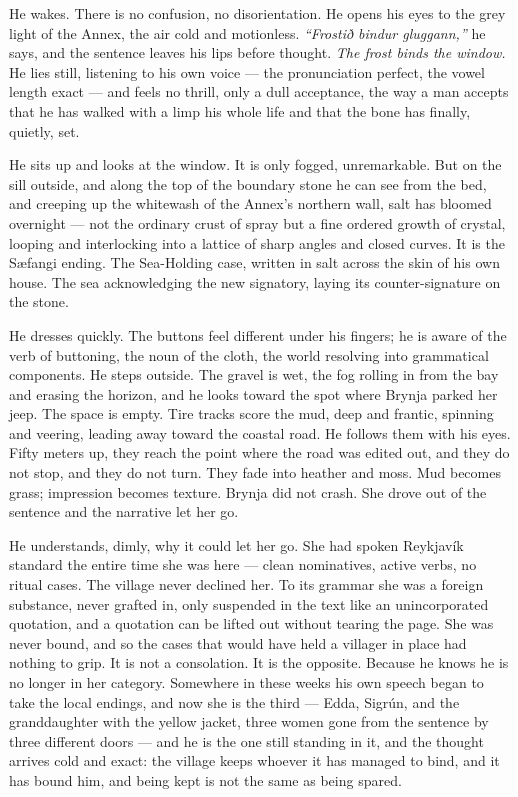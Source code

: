 \documentclass[11pt,oneside]{book}
\begin{document}
He wakes. There is no confusion, no disorientation. He opens his eyes to
the grey light of the Annex, the air cold and motionless.
\emph{``Frostið bindur gluggann,''} he says, and the sentence leaves his
lips before thought. \emph{The frost binds the window.} He lies still,
listening to his own voice --- the pronunciation perfect, the vowel
length exact --- and feels no thrill, only a dull acceptance, the way a
man accepts that he has walked with a limp his whole life and that the
bone has finally, quietly, set.

He sits up and looks at the window. It is only fogged, unremarkable. But
on the sill outside, and along the top of the boundary stone he can see
from the bed, and creeping up the whitewash of the Annex's northern
wall, salt has bloomed overnight --- not the ordinary crust of spray but
a fine ordered growth of crystal, looping and interlocking into a
lattice of sharp angles and closed curves. It is the Sæfangi ending. The
Sea-Holding case, written in salt across the skin of his own house. The
sea acknowledging the new signatory, laying its counter-signature on the
stone.

He dresses quickly. The buttons feel different under his fingers; he is
aware of the verb of buttoning, the noun of the cloth, the world
resolving into grammatical components. He steps outside. The gravel is
wet, the fog rolling in from the bay and erasing the horizon, and he
looks toward the spot where Brynja parked her jeep. The space is empty.
Tire tracks score the mud, deep and frantic, spinning and veering,
leading away toward the coastal road. He follows them with his eyes.
Fifty meters up, they reach the point where the road was edited out, and
they do not stop, and they do not turn. They fade into heather and moss.
Mud becomes grass; impression becomes texture. Brynja did not crash. She
drove out of the sentence and the narrative let her go.

He understands, dimly, why it could let her go. She had spoken Reykjavík
standard the entire time she was here --- clean nominatives, active
verbs, no ritual cases. The village never declined her. To its grammar
she was a foreign substance, never grafted in, only suspended in the
text like an unincorporated quotation, and a quotation can be lifted out
without tearing the page. She was never bound, and so the cases that
would have held a villager in place had nothing to grip. It is not a
consolation. It is the opposite. Because he knows he is no longer in her
category. Somewhere in these weeks his own speech began to take the
local endings, and now she is the third --- Edda, Sigrún, and the
granddaughter with the yellow jacket, three women gone from the sentence
by three different doors --- and he is the one still standing in it, and
the thought arrives cold and exact: the village keeps whoever it has
managed to bind, and it has bound him, and being kept is not the same as
being spared.
\end{document}
